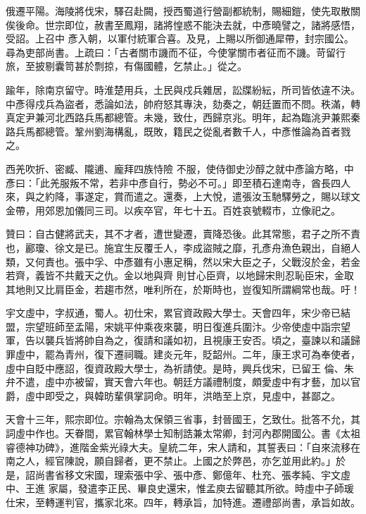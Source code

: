 \begin{pinyinscope}
 俄遷平陽。海陵將伐宋，驛召赴闕，授西蜀道行營副都統制，賜細鎧，使先取散關俟後命。世宗即位，赦書至鳳翔，諸將惶惑不能決去就，中彥曉譬之，諸將感悟，受詔。上召中
 彥入朝，以軍付統軍合喜。及見，上賜以所御通犀帶，封宗國公。尋為吏部尚書。上疏曰：「古者關市譏而不征，今使掌關市者征而不譏。苛留行旅，至披剔囊笥甚於剽掠，有傷國體，乞禁止。」從之。



 踰年，除南京留守。時淮楚用兵，土民與戍兵雜居，訟牒紛紜，所司皆依違不決。中彥得戍兵為盜者，悉論如法，帥府怒其專決，劾奏之，朝廷置而不問。秩滿，轉真定尹兼河北西路兵馬都總管。未幾，致仕，西歸京兆。明年，起為臨洮尹兼熙秦路兵馬都總管。鞏州劉海構亂，既敗，籍民之從亂者數千人，中彥惟論為首者戮之。



 西羌吹折、密臧、隴逋、龐拜四族恃險
 不服，使侍御史沙醇之就中彥論方略，中彥曰：「此羌服叛不常，若非中彥自行，勢必不可。」即至積石達南寺，酋長四人來，與之約降，事遂定，賞而遣之。還奏，上大悅，遣張汝玉馳驛勞之，賜以球文金帶，用郊恩加儀同三司。以疾卒官，年七十五。百姓哀號輟市，立像祀之。



 贊曰：自古健將武夫，其不才者，遭世變遷，賣降恐後。此其常態，君子之所不責也，酈瓊、徐文是已。施宜生反覆壬人，李成盜賊之靡，孔彥舟漁色親出，自絕人類，又何責也。張中孚、中彥雖有小惠足稱，然以宋大臣之子，父戰沒於金，若金若齊，義皆不共戴天之仇。金以地與齊
 則甘心臣齊，以地歸宋則忍恥臣宋，金取其地則又比肩臣金，若趨市然，唯利所在，於斯時也，豈復知所謂綱常也哉。吁！



 宇文虛中，字叔通，蜀人。初仕宋，累官資政殿大學士。天會四年，宋少帝已結盟，宗望班師至孟陽，宋姚平仲乘夜來襲，明日復進兵圍汴。少帝使虛中詣宗望軍，告以襲兵皆將帥自為之，復請和議如初，且視康王安否。頃之，臺諫以和議歸罪虛中，罷為青州，復下遷祠職。建炎元年，貶韶州。二年，康王求可為奉使者，虛中自貶中應詔，復資政殿大學士，為祈請使。是時，興兵伐宋，已留王
 倫、朱弁不遣，虛中亦被留，實天會六年也。朝廷方議禮制度，頗愛虛中有才藝，加以官爵，虛中即受之，與韓昉輩俱掌詞命。明年，洪皓至上京，見虛中，甚鄙之。



 天會十三年，熙宗即位。宗翰為太保領三省事，封晉國王，乞致仕。批答不允，其詞虛中作也。天眷間，累官翰林學士知制誥兼太常卿，封河內郡開國公。書《太祖睿德神功碑》，進階金紫光祿大夫。皇統二年，宋人請和，其誓表曰：「自來流移在南之人，經官陳說，願自歸者，更不禁止。上國之於弊邑，亦乞並用此約。」於是，詔尚書省移文宋國，理索張中孚、張中彥、鄭億年、杜充、張孝純、宇文虛中、王進
 家屬，發遣李正民、畢良史還宋，惟孟庾去留聽其所欲。時虛中子師瑗仕宋，至轉運判官，攜家北來。四年，轉承旨，加特進。遷禮部尚書，承旨如故。




\end{pinyinscope}
